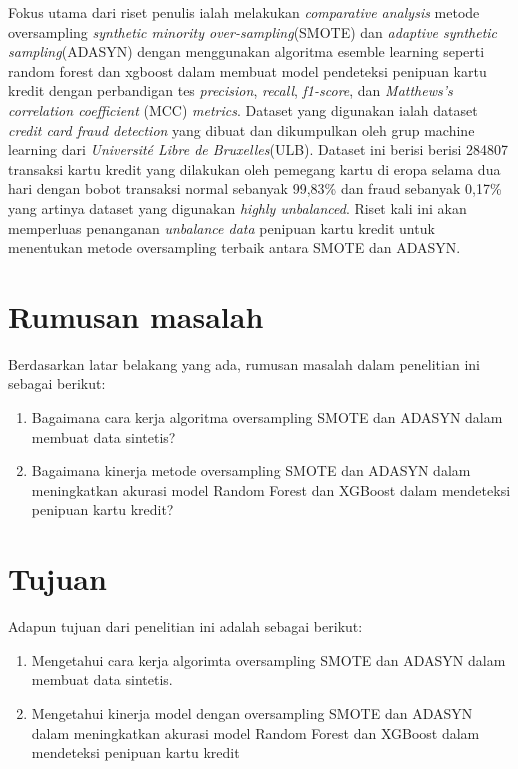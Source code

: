 Fokus utama dari riset penulis ialah melakukan \textit{comparative analysis} metode oversampling \textit{synthetic minority over-sampling}(SMOTE) dan \textit{adaptive synthetic sampling}(ADASYN) dengan menggunakan algoritma esemble learning seperti random forest dan xgboost dalam membuat model pendeteksi penipuan kartu kredit dengan perbandigan tes \textit{precision}, \textit{recall}, \textit{f1-score}, dan \textit{Matthews’s correlation coefficient} (MCC) \textit{metrics}. Dataset yang digunakan ialah dataset \textit{credit card fraud detection} yang dibuat dan dikumpulkan oleh grup machine learning dari \textit{Université Libre de Bruxelles}(ULB)\cite{dal2015calibrating}. Dataset ini berisi berisi 284807 transaksi kartu kredit yang dilakukan oleh pemegang kartu di  eropa  selama  dua  hari  dengan bobot  transaksi  normal  sebanyak  99,83\%  dan  fraud  sebanyak  0,17\% yang artinya dataset yang digunakan \textit{highly unbalanced}\cite{WinNT}. 
Riset kali ini akan memperluas penanganan \textit{unbalance data} penipuan kartu kredit untuk menentukan metode oversampling terbaik antara SMOTE dan ADASYN.

\section{Rumusan masalah} \label{I.Rumusan Masalah}
Berdasarkan latar belakang yang ada, rumusan masalah dalam penelitian ini sebagai berikut:

\begin{enumerate}[noitemsep]
        \item Bagaimana cara kerja algoritma oversampling SMOTE dan ADASYN dalam membuat data sintetis?
        \item Bagaimana kinerja metode oversampling SMOTE dan ADASYN dalam meningkatkan akurasi model Random Forest dan XGBoost dalam mendeteksi penipuan kartu kredit?
\end{enumerate}

\section{Tujuan} \label{I.Tujuan}
Adapun tujuan dari penelitian ini adalah sebagai berikut:
\begin{enumerate}[noitemsep]
        \item Mengetahui cara kerja algorimta oversampling SMOTE dan ADASYN dalam membuat data sintetis.
        \item Mengetahui kinerja model dengan oversampling SMOTE dan ADASYN dalam meningkatkan akurasi model Random Forest dan XGBoost dalam mendeteksi penipuan kartu kredit
\end{enumerate}

